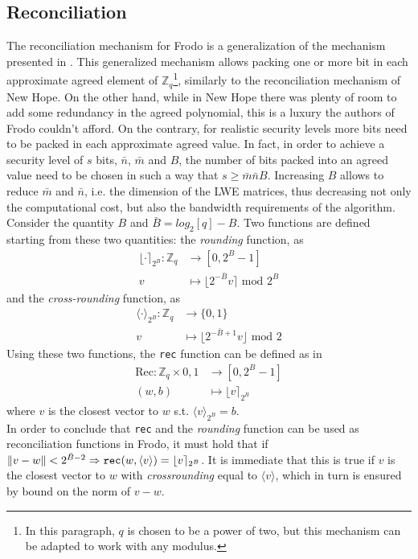 \subsection{Reconciliation}\label{sec:fr:rec}
The reconciliation mechanism for Frodo is a generalization of the mechanism presented in \cite{peikert_2014}. This generalized mechanism allows packing one or more bit in each approximate agreed element of $\mathbb{Z}_q$\footnote{In this paragraph, $q$ is chosen to be a power of two, but this mechanism can be adapted to work with any modulus.}, similarly to the reconciliation mechanism of New Hope. On the other hand, while in New Hope there was plenty of room to add some redundancy in the agreed polynomial, this is a luxury the authors of Frodo couldn't afford. On the contrary, for realistic security levels more bits need to be packed in each approximate agreed value. In fact, in order to achieve a security level of $s$ bits, $\bar{n}$, $\bar{m}$ and $B$, the number of bits packed into an agreed value need to be chosen in such a way that $s\ge\bar{m}\bar{n}B$. Increasing $B$ allows to reduce $\bar{m}$ and $\bar{n}$, i.e. the dimension of the LWE matrices, thus decreasing not only the computational cost, but also the bandwidth requirements of the algorithm.\\
Consider the quantity $B$ and $\bar{B}=log_2[q]-B$. Two functions are defined starting from these two quantities: the \textit{rounding} function, as
\begin{align*}
\lfloor \cdot \rceil_{2^B} : \mathbb{Z}_q &\rightarrow [0,2^B-1] \\
v &\mapsto \lfloor 2^{-\bar{B}}v \rceil\text{ mod }2^B
\end{align*}
and the \textit{cross-rounding} function, as
\begin{align*}
\langle \cdot \rangle_{2^B} : \mathbb{Z}_q &\rightarrow \{0,1\}\\
v &\mapsto \lfloor 2^{-\bar{B}+1}v \rfloor\text{ mod }2
\end{align*}
Using these two functions, the \verb|rec| function can be defined as in \cite{peikert_2014}
\begin{align*}
\text{Rec} : \mathbb{Z}_q \times {0,1} &\rightarrow [0,2^B-1]\\
(w,b) &\mapsto \lfloor v \rceil_{2^B}
\end{align*}
where $v$ is the closest vector to $w$ s.t. $\langle v \rangle_{2^B} = b$.\\
In order to conclude that \verb|rec| and the \textit{rounding} function can be used as reconciliation functions in Frodo, it must hold that if $\norm{v-w} < 2^{\bar{B}-2}\Rightarrow\verb|rec|(w,\langle v \rangle)=\lfloor v \rceil_{2^B}$. It is immediate that this is true if $v$ is the closest vector to $w$ with \textit{crossrounding} equal to $\langle v \rangle$, which in turn is ensured by bound on the norm of $v-w$.\\

